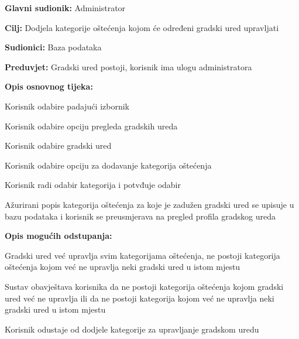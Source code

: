 \noindent {}
\begin{packed_item}

	\item \textbf{Glavni sudionik: }Administrator
	\item  \textbf{Cilj:} Dodjela kategorije oštećenja kojom će određeni gradski ured upravljati
	\item  \textbf{Sudionici:} Baza podataka
	\item  \textbf{Preduvjet:} Gradski ured postoji, korisnik ima ulogu administratora
	\item  \textbf{Opis osnovnog tijeka:}

	\item[] \begin{packed_enum}

		\item Korisnik odabire padajući izbornik
		\item Korisnik odabire opciju pregleda gradskih ureda
		\item Korisnik odabire gradski ured
		\item Korisnik odabire opciju za dodavanje kategorija oštećenja 
		\item Korisnik radi odabir kategorija i potvđuje odabir
		\item Ažurirani popis kategorija oštećenja za koje je zadužen gradski ured se upisuje u bazu podataka i korisnik se preusmjerava na pregled profila gradskog ureda
	\end{packed_enum}

	\item  \textbf{Opis mogućih odstupanja:}

	\item[] \begin{packed_item}

		\item[4.a] Gradski ured već upravlja svim kategorijama oštećenja, ne postoji kategorija oštećenja kojom već ne upravlja neki gradski ured u istom mjestu
		\item[] \begin{packed_enum}

			\item Sustav obavještava korisnika da ne postoji kategorija oštećenja kojom gradski ured već ne upravlja ili da ne postoji kategorija kojom već ne upravlja neki gradski ured u istom mjestu
			\item Korisnik odustaje od dodjele kategorije za upravljanje gradskom uredu

		\end{packed_enum}
	\end{packed_item}
\end{packed_item}


